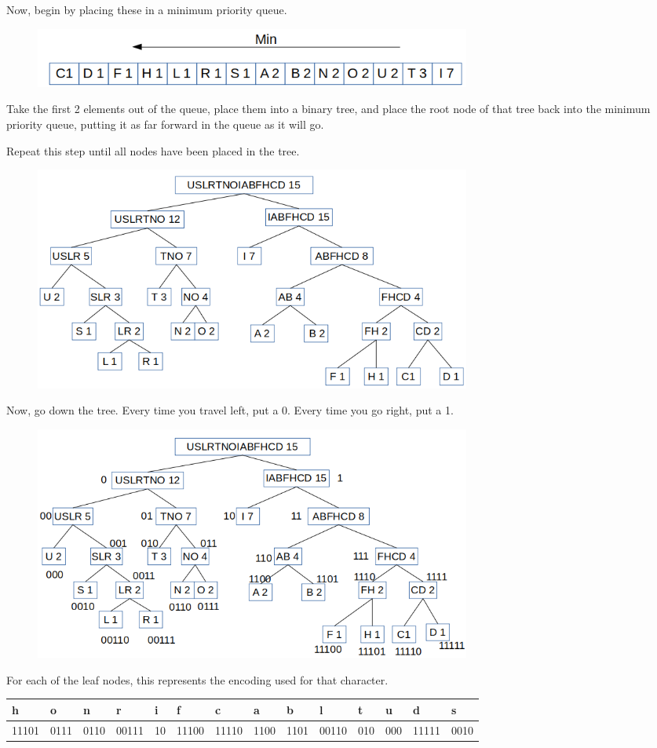 \documentclass{article}
\begin{document}
\begin{enumerate}
Now, begin by placing these in a minimum priority queue. 

\begin{figure}[H]
	\includegraphics[width=0.7\textwidth]{P9/queue}
\end{figure}


Take the first 2 elements out of the queue, place them into a binary tree, and place the root node of that tree back into the minimum priority queue, putting it as far forward in the queue as it will go. 

Repeat this step until all nodes have been placed in the tree. 
\begin{figure}[H]
	\includegraphics[width=0.7\textwidth]{P9/tree}
\end{figure}

Now, go down the tree. Every time you travel left, put a 0. Every time you go right, put a 1. 


\begin{figure}[H]
	\includegraphics[width=0.7\textwidth]{P9/tree_num}
\end{figure}

For each of the leaf nodes, this represents the encoding used for that character. 

\begin{table}[H]
\begin{tabular}{|l|l|l|l|l|l|l|l|l|l|l|l|l|l|}
\hline
h & o & n & r & i & f & c & a & b & l & t & u & d & s \\ \hline
11101 & 0111 & 0110 & 00111 & 10 & 11100 & 11110 & 1100 & 1101 & 00110 & 010 & 000 & 11111 & 0010 \\ \hline
\end{tabular}
\end{table}


\end{enumerate}
\end{document}
